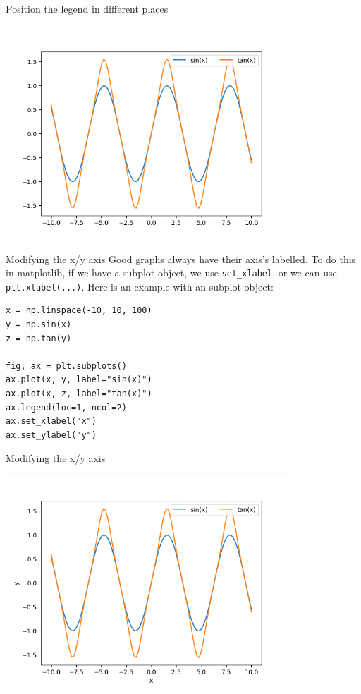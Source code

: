 \documentclass[10pt]{beamer}
\begin{document}
\begin{frame}[label={sec:org6014b9e}]{Position the legend in different places}
\begin{center}
\includegraphics[width=0.8\textwidth]{images/legend-2.png}
\end{center}
\end{frame}

\begin{frame}[label={sec:org0c975b6},fragile]{Modifying the x/y axis}
 Good graphs always have their axis's labelled. To do this in matplotlib, if we
have a subplot object, we use \texttt{set\_xlabel}, or we can use \texttt{plt.xlabel(...)}. Here is
an example with an subplot object:

\begin{verbatim}
x = np.linspace(-10, 10, 100)
y = np.sin(x)
z = np.tan(y)

fig, ax = plt.subplots()
ax.plot(x, y, label="sin(x)")
ax.plot(x, z, label="tan(x)")
ax.legend(loc=1, ncol=2)
ax.set_xlabel("x")
ax.set_ylabel("y")
\end{verbatim}
\end{frame}

\begin{frame}[label={sec:org9dda7da}]{Modifying the x/y axis}
\begin{center}
\includegraphics[width=0.8\textwidth]{images/axis.png}
\end{center}
\end{frame}
\end{document}
